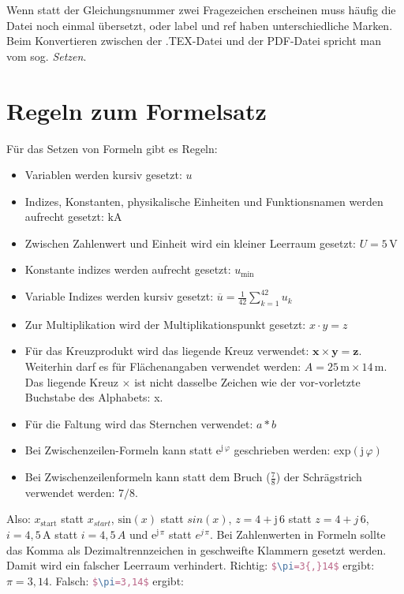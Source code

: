 Wenn statt der Gleichungsnummer zwei Fragezeichen erscheinen muss
häufig die Datei noch einmal übersetzt, oder label und ref haben unterschiedliche
Marken. Beim Konvertieren zwischen der .TEX-Datei und der PDF-Datei
spricht man vom sog. \textit{Setzen}.

\section{Regeln zum Formelsatz}

\label{eq:formelsatz}Für das Setzen von Formeln gibt es Regeln:
\begin{itemize}
\item Variablen werden kursiv gesetzt: $u$
\item Indizes, Konstanten, physikalische Einheiten und Funktionsnamen werden
aufrecht gesetzt: $\mathrm{kA}$
\item Zwischen Zahlenwert und Einheit wird ein kleiner Leerraum gesetzt:
$U=5\,\mathrm{V}$
\item Konstante indizes werden aufrecht gesetzt: $u_{\mathrm{min}}$
\item Variable Indizes werden kursiv gesetzt: $\overline{u}=\frac{1}{42}\sum_{k=1}^{42}u_{k}$
\item Zur Multiplikation wird der Multiplikationspunkt gesetzt: $x\cdot y=z$
\item Für das Kreuzprodukt wird das liegende Kreuz verwendet: $\boldsymbol{x}\times\boldsymbol{y}=\boldsymbol{z}$.
Weiterhin darf es für Flächenangaben verwendet werden: $A=25\,\mathrm{m}\times14\,\mathrm{m}$.
Das liegende Kreuz $\times$ ist nicht dasselbe Zeichen wie der vor-vorletzte
Buchstabe des Alphabets: x.
\item Für die Faltung wird das Sternchen verwendet: $a*b$
\item Bei Zwischenzeilen-Formeln kann statt $\mathrm{e}^{\mathrm{j}\,\varphi}$
geschrieben werden: $\mathrm{exp}\left(\mathrm{j}\,\varphi\right)$
\item Bei Zwischenzeilenformeln kann statt dem Bruch ($\frac{7}{8}$) der
Schrägstrich verwendet werden: $7/8$.
\end{itemize}
Also: $x_{\mathrm{start}}$ statt $x_{start}$, $\mathrm{sin}(x)$
statt $sin(x)$, $z=4+\mathrm{j}\,6$ statt $z=4+j\,6$, $i=4{,}5\,\mathrm{A}$
statt $i=4{,}5\,A$ und $\mathrm{e}^{\mathrm{j}\,\pi}$ statt $e^{j\,\pi}$.
Bei Zahlenwerten in Formeln sollte das Komma als Dezimaltrennzeichen
in geschweifte Klammern gesetzt werden. Damit wird ein falscher Leerraum
verhindert. Richtig: \lstinline[language=TeX]|$\pi=3{,}14$| ergibt:
$\pi=3{,}14$. Falsch: \lstinline[language=TeX]|$\pi=3,14$| ergibt:

